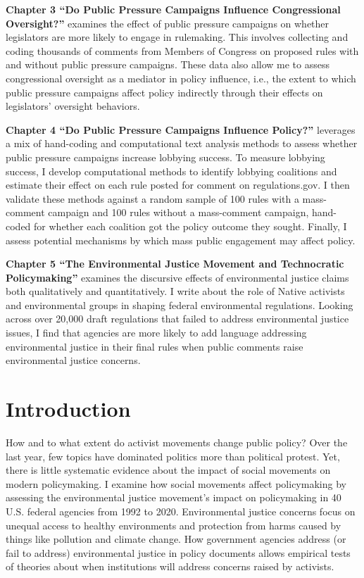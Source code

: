\documentclass[
      12pt,
        ]{article}
\begin{document}
\textbf{Chapter 3 ``Do Public Pressure Campaigns Influence Congressional Oversight?''} examines the effect of public pressure campaigns on whether legislators are more likely to engage in rulemaking. This involves collecting and coding thousands of comments from Members of Congress on proposed rules with and without public pressure campaigns. These data also allow me to assess congressional oversight as a mediator in policy influence, i.e., the extent to which public pressure campaigns affect policy indirectly through their effects on legislators' oversight behaviors.

\textbf{Chapter 4 ``Do Public Pressure Campaigns Influence Policy?''} leverages a mix of hand-coding and computational text analysis methods to assess whether public pressure campaigns increase lobbying success. To measure lobbying success, I develop computational methods to identify lobbying coalitions and estimate their effect on each rule posted for comment on regulations.gov. I then validate these methods against a random sample of 100 rules with a mass-comment campaign and 100 rules without a mass-comment campaign, hand-coded for whether each coalition got the policy outcome they sought. Finally, I assess potential mechanisms by which mass public engagement may affect policy.

\textbf{Chapter 5 ``The Environmental Justice Movement and Technocratic Policymaking''} examines the discursive effects of environmental justice claims both qualitatively and quantitatively. I write about the role of Native activists and environmental groups in shaping federal environmental regulations. Looking across over 20,000 draft regulations that failed to address environmental justice issues, I find that agencies are more likely to add language addressing environmental justice in their final rules when public comments raise environmental justice concerns.

\newpage

\onehalfspacing

\setcounter{page}{1}

\hypertarget{introduction}{%
\section{Introduction}\label{introduction}}

How and to what extent do activist movements change public policy? Over the last year, few topics have dominated politics more than political protest. Yet, there is little systematic evidence about the impact of social movements on modern policymaking. I examine how social movements affect policymaking by assessing the environmental justice movement's impact on policymaking in 40 U.S. federal agencies from 1992 to 2020. Environmental justice
concerns focus on unequal access to healthy environments and
protection from harms caused by things like pollution and climate
change. How government agencies address (or fail to address) environmental justice in policy documents allows empirical tests of theories about when institutions will address concerns raised by activists.
\end{document}
